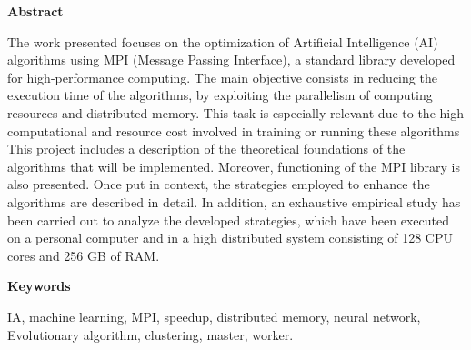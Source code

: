 
\newpage

\thispagestyle{empty}

\begin{center}

{\bf \Huge Abstract}

  \end{center}
\vspace{1cm}

The work presented focuses on the optimization of Artificial Intelligence (AI) algorithms using MPI (Message Passing Interface), a standard library developed for high-performance computing.
The main objective consists in reducing the execution time of the algorithms, by exploiting the parallelism of computing resources and distributed memory. This task is especially relevant due to the high computational and resource cost involved in training or running these algorithms
This project includes a description of the theoretical foundations of the algorithms that will be implemented. Moreover, functioning of the MPI library is also presented.
Once put in context, the strategies employed to enhance the algorithms are described in detail.
In addition, an exhaustive empirical study has been carried out to analyze the developed strategies, which have been executed on a personal computer and in a high distributed system consisting of 128 CPU cores and 256 GB of RAM.


\vspace{1cm}


\begin{center}

{\bf \Large Keywords}

   \end{center}

   \vspace{0.5cm}
   
IA, machine learning, MPI, speedup, distributed memory, neural network, Evolutionary algorithm, clustering, master, worker.
   


